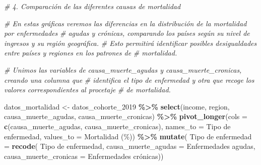 \documentclass[,article,,moreauthors,pdftex]{Definitions/mdpi}
\newenvironment{Shaded}{\begin{snugshade}}{\end{snugshade}}
\newcommand{\AttributeTok}[1]{\textcolor[rgb]{0.13,0.29,0.53}{#1}}
\newcommand{\CommentTok}[1]{\textcolor[rgb]{0.56,0.35,0.01}{\textit{#1}}}
\newcommand{\FunctionTok}[1]{\textcolor[rgb]{0.13,0.29,0.53}{\textbf{#1}}}
\newcommand{\NormalTok}[1]{#1}
\newcommand{\OtherTok}[1]{\textcolor[rgb]{0.56,0.35,0.01}{#1}}
\newcommand{\SpecialCharTok}[1]{\textcolor[rgb]{0.81,0.36,0.00}{\textbf{#1}}}
\newcommand{\StringTok}[1]{\textcolor[rgb]{0.31,0.60,0.02}{#1}}
\begin{document}
\begin{Shaded}
\begin{Highlighting}[]
\CommentTok{\# 4. Comparación de las diferentes causas de mortalidad}

\CommentTok{\# En estas gráficas veremos las diferencias en la distribución de la mortalidad por enfermedades}
\CommentTok{\# agudas y crónicas, comparando los países según su nivel de ingresos y su región geográfica. }
\CommentTok{\# Esto permitirá identificar posibles desigualdades entre países y regiones en los patrones de}
\CommentTok{\# mortalidad.}

\CommentTok{\# Unimos las variables de causa\_muerte\_agudas y causa\_muerte\_cronicas, creando una columna que}
\CommentTok{\# identifica el tipo de enfermedad y otra que recoge los valores correspondientes al procetaje }
\CommentTok{\# de mortalidad. }

\NormalTok{datos\_mortalidad }\OtherTok{\textless{}{-}}\NormalTok{ datos\_cohorte\_2019 }\SpecialCharTok{\%\textgreater{}\%}
  \FunctionTok{select}\NormalTok{(income, region, causa\_muerte\_agudas, causa\_muerte\_cronicas) }\SpecialCharTok{\%\textgreater{}\%}
 \FunctionTok{pivot\_longer}\NormalTok{(}\AttributeTok{cols =} \FunctionTok{c}\NormalTok{(causa\_muerte\_agudas, causa\_muerte\_cronicas),}
              \AttributeTok{names\_to =} \StringTok{\textquotesingle{}Tipo de enfermedad\textquotesingle{}}\NormalTok{, }\AttributeTok{values\_to =} \StringTok{\textquotesingle{}Mortalidad (\%)\textquotesingle{}}\NormalTok{) }\SpecialCharTok{\%\textgreater{}\%}
 \FunctionTok{mutate}\NormalTok{(}
   \StringTok{\textasciigrave{}}\AttributeTok{Tipo de enfermedad}\StringTok{\textasciigrave{}} \OtherTok{=} \FunctionTok{recode}\NormalTok{(}
     \StringTok{\textasciigrave{}}\AttributeTok{Tipo de enfermedad}\StringTok{\textasciigrave{}}\NormalTok{, }\AttributeTok{causa\_muerte\_agudas =} \StringTok{\textquotesingle{}Enfermedades agudas\textquotesingle{}}\NormalTok{,}
     \AttributeTok{causa\_muerte\_cronicas =} \StringTok{\textquotesingle{}Enfermedades crónicas\textquotesingle{}}\NormalTok{))}


\end{Highlighting}
\end{Shaded}
\end{document}
